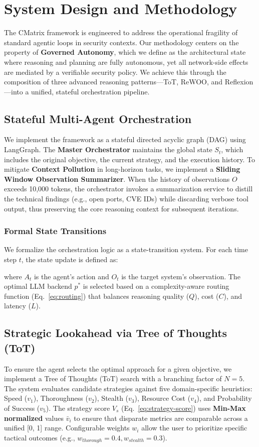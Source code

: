 \section{System Design and Methodology}

The CMatrix framework is engineered to address the operational fragility of standard agentic loops in security contexts. Our methodology centers on the property of \textbf{Governed Autonomy}, which we define as the architectural state where reasoning and planning are fully autonomous, yet all network-side effects are mediated by a verifiable security policy. We achieve this through the composition of three advanced reasoning patterns—ToT, ReWOO, and Reflexion—into a unified, stateful orchestration pipeline.

\subsection{Stateful Multi-Agent Orchestration}
We implement the framework as a stateful directed acyclic graph (DAG) using LangGraph. The \textbf{Master Orchestrator} maintains the global state $S_t$, which includes the original objective, the current strategy, and the execution history. 
To mitigate \textbf{Context Pollution} in long-horizon tasks, we implement a \textbf{Sliding Window Observation Summarizer}. When the history of observations $O$ exceeds 10,000 tokens, the orchestrator invokes a summarization service to distill the technical findings (e.g., open ports, CVE IDs) while discarding verbose tool output, thus preserving the core reasoning context for subsequent iterations.

\subsubsection{Formal State Transitions}
We formalize the orchestration logic as a state-transition system. For each time step $t$, the state update is defined as:

where $A_t$ is the agent's action and $O_t$ is the target system's observation. The optimal LLM backend $p^*$ is selected based on a complexity-aware routing function (Eq.~\ref{eq:routing}) that balances reasoning quality ($Q$), cost ($C$), and latency ($L$).



\subsection{Strategic Lookahead via Tree of Thoughts (ToT)}
To ensure the agent selects the optimal approach for a given objective, we implement a Tree of Thoughts (ToT) search with a branching factor of $N=5$. 
The system evaluates candidate strategies against five domain-specific heuristics: Speed ($v_1$), Thoroughness ($v_2$), Stealth ($v_3$), Resource Cost ($v_4$), and Probability of Success ($v_5$). The strategy score $V_s$ (Eq.~\ref{eq:strategy-score}) uses \textbf{Min-Max normalized} values $\bar{v}_i$ to ensure that disparate metrics are comparable across a unified [0, 1] range. Configurable weights $w_i$ allow the user to prioritize specific tactical outcomes (e.g., $w_{thorough}=0.4, w_{stealth}=0.3$).


